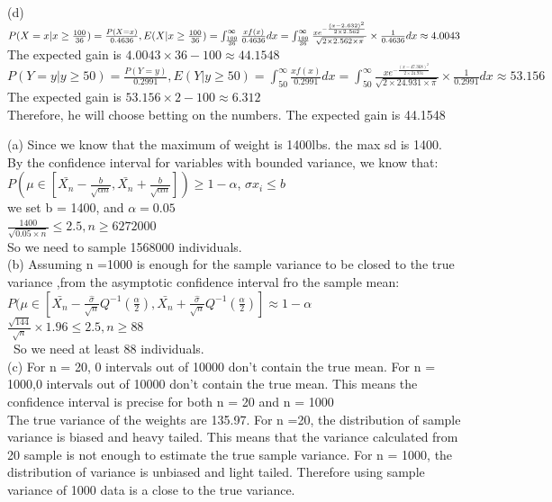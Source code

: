 \documentclass[11pt]{article}
\newenvironment{problem}[2][Problem]{\begin{trivlist}
\item[\hskip \labelsep {\bfseries #1}\hskip \labelsep {\bfseries #2.}]}{\end{trivlist}}
\begin{document}
(d)$P(X=x|x \geq \frac{100}{36}) = \frac{P(X= x)}{0.4636}, E(X|x \geq \frac{100}{36}) = \int_{\frac{100}{36}}^{\infty} \frac{xf(x)}{0.4636}dx \\= \int_{\frac{100}{36}}^{\infty} \frac{xe^{-\frac{(x - 2.632)^2}{2\times2.562}}}{\sqrt{2\times 2.562 \times \pi}} \times \frac{1}{0.4636}dx \approx  4.0043  $\\
The expected gain is $4.0043\times 36 -100 \approx 44.1548$\\
$P(Y=y|y \geq 50) = \frac{P(Y= y)}{0.2991}, E(Y|y \geq 50) = \int_{50}^{\infty} \frac{xf(x)}{0.2991}dx = \int_{50}^{\infty} \frac{xe^{-\frac{(x - 47.368)^2}{2\times24.931}}}{\sqrt{2\times 24.931 \times \pi}} \times \frac{1}{0.2991}dx \approx  53.156  $\\
The expected gain is $ 53.156\times 2 -100 \approx 6.312$\\
Therefore, he will choose betting on the numbers. The expected gain is 44.1548\\

\pagebreak

\begin{problem}{2}
\end{problem}
(a) Since we know that the maximum of weight is 1400lbs. the max sd is 1400.\\
By the confidence interval for variables with bounded variance, we know that:\\ $P(\mu \in [\bar{X_n} - \frac{b}{\sqrt{\alpha n}},\bar{X_n} + \frac{b}{\sqrt{\alpha n}}])\geq 1- \alpha$, $\sigma x_i \leq b$\\
we set b = 1400, and $\alpha  = 0.05$\\
$\frac{1400}{\sqrt{0.05\times n}} \leq 2.5, n\geq 6272000$\\
So we need to sample 1568000 individuals.\\

(b) Assuming n =1000 is enough for the sample variance to be closed to the true variance ,from the asymptotic confidence interval fro the sample mean:\\
$P(\mu \in [\bar{X_n} - \frac{\hat{\sigma}}{\sqrt{n}}Q^{-1}(\frac{\alpha}{2}),\bar{X_n} + \frac{\hat{\sigma}}{\sqrt{n}}Q^{-1}(\frac{\alpha}{2})] \approx 1- \alpha$\\
$\frac{\sqrt{144}}{\sqrt{n}} \times 1.96 \leq 2.5, n\geq 88$\\\
So we need at least 88 individuals.\\

(c) For n = 20, 0 intervals out of 10000 don't contain the true mean. For n = 1000,0 intervals out of 10000 don't contain the true mean. This means the confidence interval is precise for both n = 20 and n = 1000\\
The true variance of the weights are 135.97. For n =20, the distribution of sample variance is biased and heavy tailed. This means that the variance calculated from 20 sample is not enough to estimate the true sample variance. For n = 1000, the distribution of variance is unbiased and light tailed. Therefore using sample variance of 1000 data is a close to the true variance.  \\
\end{document}
